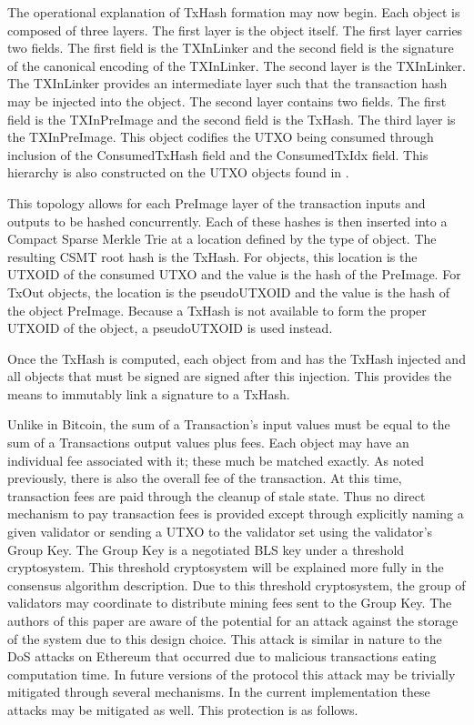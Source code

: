 The operational explanation of TxHash formation may now begin.
Each \TxIn{} object is composed of three layers.
The first layer is the \TxIn{} object itself.
The first layer carries two fields.
The first field is the TXInLinker and the second field is the signature
of the canonical encoding of the TXInLinker.
The second layer is the TXInLinker.
The TXInLinker provides an intermediate layer such that the transaction
hash may be injected into the object.
The second layer contains two fields.
The first field is the TXInPreImage and the second field is the TxHash.
The third layer is the TXInPreImage.
This object codifies the UTXO being consumed through inclusion of the
ConsumedTxHash field and the ConsumedTxIdx field.
This hierarchy is also constructed on the UTXO objects found in \Vout{}.

This topology allows for each PreImage layer of the transaction inputs
and outputs to be hashed concurrently.
Each of these hashes is then inserted into a Compact Sparse Merkle Trie
at a location defined by the type of object.
The resulting CSMT root hash is the TxHash.
For \TxIn{} objects, this location is the UTXOID of the consumed UTXO and
the value is the hash of the \TxIn{} PreImage.
For TxOut objects, the location is the pseudoUTXOID and the value is
the hash of the object PreImage.
Because a TxHash is not available to form the proper UTXOID of the
object, a pseudoUTXOID is used instead.

Once the TxHash is computed, each object from \Vin{} and \Vout{} has the
TxHash injected and all objects that must be signed are signed after
this injection.
This provides the means to immutably link a signature to a TxHash.

Unlike in Bitcoin, the sum of a Transaction’s input values must be
equal to the sum of a Transactions output values plus fees.
Each object may have an individual fee associated with it;
these much be matched exactly.
As noted previously, there is also the overall fee of the transaction.
At this time, transaction fees are paid through the cleanup of stale
state.
Thus no direct mechanism to pay transaction fees is provided except
through explicitly naming a given validator or sending a UTXO to the
validator set using the validator’s Group Key.
The Group Key is a negotiated BLS key under a threshold cryptosystem.
This threshold cryptosystem will be explained more fully in the
consensus algorithm description.
Due to this threshold cryptosystem, the group of validators may
coordinate to distribute mining fees sent to the Group Key.
The authors of this paper are aware of the potential for an attack
against the storage of the system due to this design choice.
This attack is similar in nature to the DoS attacks on Ethereum that
occurred due to malicious transactions eating computation time.
In future versions of the protocol this attack may be trivially
mitigated through several mechanisms.
In the current implementation these attacks may be mitigated as well.
This protection is as follows.


